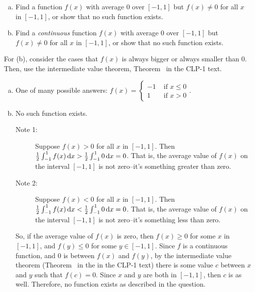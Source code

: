 \begin{Mquestion}
\begin{enumerate}[(a)]
\item Find a function $f(x)$ with average $0$ over $[-1,1]$ but $f(x) \neq 0$ for all $x$ in $[-1,1]$, or show that no such function exists.
\item Find a \emph{continuous} function $f(x)$ with average $0$ over $[-1,1]$ but $f(x) \neq 0$ for all $x$ in $[-1,1]$, or show that no such function exists.
\end{enumerate}
\end{Mquestion}
\begin{hint}
For (b), consider the cases that $f(x)$ is always bigger or always smaller than 0. Then, use the intermediate value theorem, Theorem~ in the CLP-1 text.
\end{hint}
\begin{answer}
\begin{enumerate}[(a)]
\item One of many possible answers: $f(x) = \begin{cases}
-1&\text{ if } x \leq 0\\
1&\text{ if } x > 0
\end{cases}$.
\item No such function exists.
\begin{description}
\item[Note 1:] Suppose $f(x)>0$ for all $x$ in $[-1,1]$. Then $\frac{1}{2}\int_{-1}^1f(x)\,\mathrm{d}x > \frac{1}{2}\int_{-1}^10\,\mathrm{d}x =0 $. That is, the average value of $f(x)$ on the interval $[-1,1]$ is not zero--it's something greater than zero.
\item[Note 2:] Suppose $f(x)<0$ for all $x$ in $[-1,1]$. Then $\frac{1}{2}\int_{-1}^1f(x)\,\mathrm{d}x < \frac{1}{2}\int_{-1}^10\,\mathrm{d}x =0 $. That is, the average value of $f(x)$ on the interval $[-1,1]$ is not zero--it's something less than zero.
\end{description}
So, if the average value of $f(x)$ is zero, then $f(x)\ge 0$ for some $x$ in $[-1,1]$, and $f(y) \le 0$ for some $y \in [-1,1]$. Since $f$ is a continuous function, and 0 is between $f(x)$ and $f(y)$, by the intermediate value theorem (Theorem~ in the  in the CLP-1 text) there is some value $c$ between $x$ and $y$ such that $f(c)=0$. Since $x$ and $y$ are both in $[-1,1]$, then $c$ is as well. Therefore, no function exists as described in the question.
\end{enumerate}
\end{answer}
